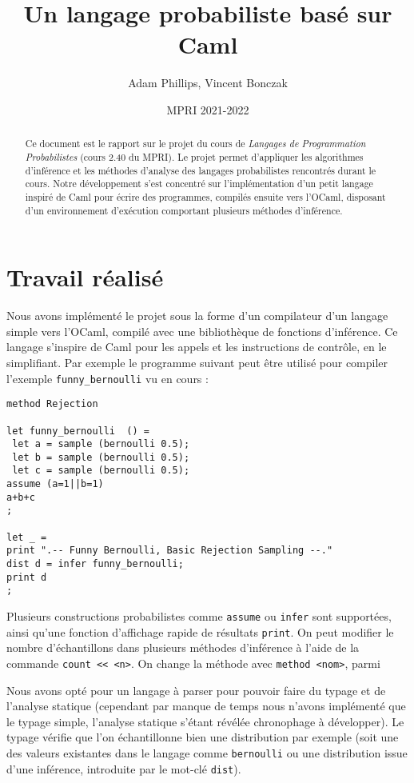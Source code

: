 \documentclass[svgnames]{article}
\begin{document}
\title{Un langage probabiliste basé sur Caml}

\author{Adam Phillips, Vincent Bonczak}

\date{MPRI 2021-2022}

\maketitle

\begin{abstract}
Ce document est le rapport sur le projet du cours de \emph{Langages de Programmation Probabilistes} (cours 2.40 du MPRI). 
Le projet permet d'appliquer les algorithmes d'inférence et les méthodes d'analyse des langages probabilistes rencontrés durant le cours. 
Notre développement s'est concentré sur l'implémentation d'un petit langage inspiré de Caml pour écrire des programmes, compilés ensuite vers
l'OCaml, disposant d'un environnement  d'exécution comportant plusieurs méthodes d'inférence.
\end{abstract}

\section{Travail réalisé}

Nous avons implémenté le projet sous la forme d'un compilateur d'un langage simple vers l'OCaml, compilé avec une bibliothèque de fonctions d'inférence.
Ce langage s'inspire de Caml pour les appels et les instructions de contrôle, en le simplifiant. Par exemple le programme suivant peut être utilisé pour compiler l'exemple \verb|funny_bernoulli| vu en cours :
\begin{lstlisting}
method Rejection

let funny_bernoulli  () =  
 let a = sample (bernoulli 0.5);
 let b = sample (bernoulli 0.5);  
 let c = sample (bernoulli 0.5); 
assume (a=1||b=1)
a+b+c
;

let _ = 
print ".-- Funny Bernoulli, Basic Rejection Sampling --."
dist d = infer funny_bernoulli;
print d
;
\end{lstlisting}

 
Plusieurs constructions probabilistes comme \verb|assume| ou \verb|infer| sont supportées, ainsi qu'une fonction d'affichage rapide de résultats \verb|print|.
On peut modifier le nombre d'échantillons dans plusieurs méthodes d'inférence à l'aide de la commande \lstinline|count << <n>|.
On change la méthode avec \lstinline{method <nom>}, parmi 

Nous avons opté pour un langage à parser pour pouvoir faire du typage et de l'analyse statique (cependant par manque de temps nous n'avons implémenté que le typage simple, l'analyse statique s'étant révélée chronophage à développer).
Le typage vérifie que l'on échantillonne bien une distribution par exemple (soit une des valeurs existantes dans le langage comme \verb|bernoulli| ou une distribution issue d'une inférence, introduite par le mot-clé \lstinline{dist}).
\end{document}
